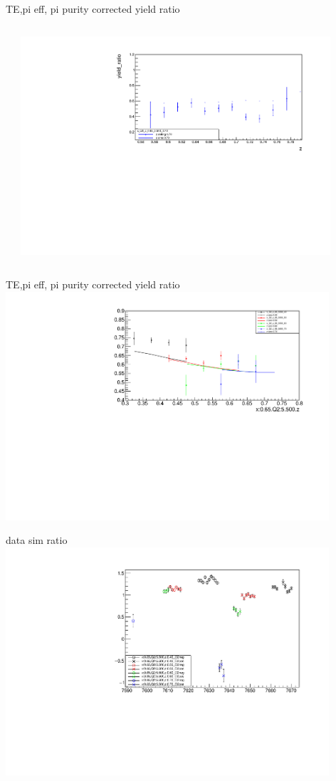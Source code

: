 \begin{frame}{TE,pi eff, pi purity corrected yield ratio}
\begin{columns}
\begin{column}[T]{0.5\textwidth}
\end{column}
\begin{column}[T]{0.5\textwidth}
\includegraphics[width = 0.9\textwidth]{results/yield/statistics_corr/x_Q2_z_65_5500_70_ratio.pdf}
\end{column}
\end{columns}
\end{frame}
\begin{frame}{TE,pi eff, pi purity corrected yield ratio}
\includegraphics[width = 0.9\textwidth]{results/yield/statistics_corr/x_Q2_65_5500_ratio.pdf}
\end{frame}
\begin{frame}{data sim ratio}
    \includegraphics[width = 0.9\textwidth]{results/yield/run_info_pdf/x_Q2_65_5500_data_simc_ratio.pdf}
\end{frame}
